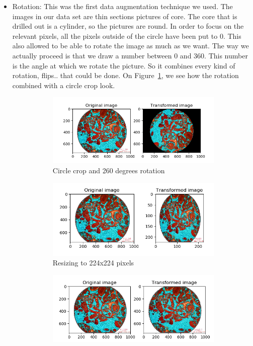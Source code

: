 \begin{itemize}
    \item Rotation: This was the first data augmentation technique we used. The images in our data set are thin sections pictures of core. The core that is drilled out is a cylinder, so the pictures are round. In order to focus on the relevant pixels, all the pixels outside of the circle have been put to 0. This also allowed to be able to rotate the image as much as we want. The way we actually proceed is that we draw a number between 0 and 360. This number is the angle at which we rotate the picture. So it combines every kind of rotation, flips.. that could be done. On Figure~\ref{fig:rotate}, we see how the rotation combined with a circle crop look.
\begin{figure}
\begin{subfigure}{.5\textwidth}
  \centering
  \includegraphics[width=.8\linewidth]{figures/03-rotation_260}
  \caption{Circle crop and 260 degrees rotation}
  \label{fig:rotate}
\end{subfigure}%
\begin{subfigure}{.5\textwidth}
  \centering
  \includegraphics[width=.8\linewidth]{figures/03-resize.PNG}
  \caption{Resizing to 224x224 pixels}
  \label{fig:resize}
\end{subfigure}
\begin{subfigure}{.5\textwidth}
  \centering
  \includegraphics[width=.8\linewidth]{figures/03-elastic_trans_08_03.PNG}

\end{subfigure}
\end{figure}
\end{itemize}
